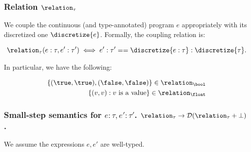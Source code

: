 \subsubsection{Relation $\relation_{\tau}$}
We couple the continuous (and type-annotated) program $e$ appropriately with its discretized one $\discretize{e}$. Formally, the coupling relation is:

\[
\relation_{\tau}(e : \tau,e' : \tau') \iff e' : \tau' == \discretize{e : \tau} : \discretize{\tau}.
\]

In particular, we have the following:

\begin{align*}
	\{(\true,\true), (\false,\false)\} \in \relation_{\bool} \\
	\{(v,v) : v \text{ is a value}\} \in \relation_{\float} \\
\end{align*}


\subsubsection{Small-step semantics for $e : \tau, e' : \tau'$.  $\relation_{\tau} \to \mathcal{D}(\relation_{\tau} + \bot)$.} 
We assume the expressions $e, e'$ are well-typed. 

